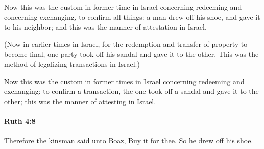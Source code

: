 			\begin{versebox}
					\item[BHS] 
					\item[LXX] 
					\item[ASV] Now this was the custom in former time in Israel concerning redeeming and concerning exchanging, to confirm all things: a man drew off his shoe, and gave it to his neighbor; and this was the manner of attestation in Israel.
					\item[NIV] (Now in earlier times in Israel, for the redemption and transfer of property to become final, one party took off his sandal and gave it to the other. This was the method of legalizing transactions in Israel.)
					\item[NRSV] Now this was the custom in former times in Israel concerning redeeming and exchanging: to confirm a transaction, the one took off a sandal and gave it to the other; this was the manner of attesting in Israel.
			\end{versebox}

		\paragraph{Ruth 4:8} %
			\label{RUTH-4-8}

			Therefore the kinsman said unto Boaz, Buy it for thee. So he drew off his shoe.

